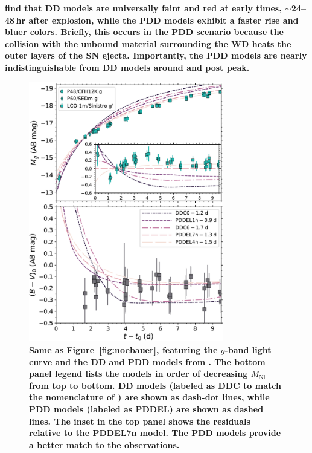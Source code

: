 \documentclass[twocolumn]{aastex61}
\begin{document}
\textbf{\citet{2014MNRAS.441..532D} find that DD models are universally faint and red at early times, $\sim$24--48\,hr after explosion, while the PDD models exhibit a faster rise and bluer colors. Briefly, this occurs in the PDD scenario because the collision with the unbound material surrounding the WD heats the outer layers of the SN ejecta. Importantly, the PDD models are nearly indistinguishable from DD models around and post peak.}

\begin{figure}[]
  \centering
  \includegraphics[width=3.35in]{compare_Dessart.pdf}
  \caption{
  \textbf{Same as Figure~\ref{fig:noebauer}, featuring the $g$-band light
  curve and the DD and PDD models from \citet{2014MNRAS.441..532D}. The bottom
  panel legend lists the models in order of decreasing $M_\mathrm{Ni}$ from
  top to bottom. DD models (labeled as DDC to match the nomenclature of
  \citealt{2014MNRAS.441..532D}) are shown as dash-dot lines, while PDD models
  (labeled as PDDEL) are shown as dashed lines. The inset in the top panel
  shows the residuals relative to the PDDEL7n model. The PDD models provide a
  better match to the observations.} }
  \label{fig:dessart} 
\end{figure}
\end{document}
